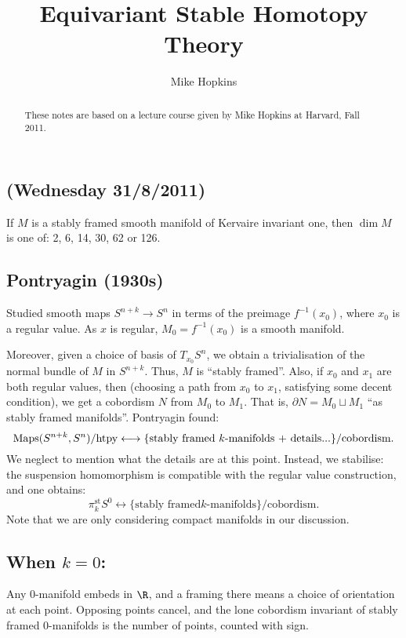 \documentclass[11pt]{article}
\title{Equivariant Stable Homotopy Theory}
\author{Mike Hopkins}
\date{}
\newcommand{\NewLecture}[3]{\section{#1 {\small(#2/#3/2011)}}}
\begin{document}
\maketitle
\begin{abstract}
These notes are based on a lecture course given by Mike Hopkins at Harvard, Fall 2011. %
\end{abstract}
\tableofcontents
\pagebreak
\begin{FirstWeek}
\setcounter{section}{0}
\NewLecture{}{Wednesday 31}{8}
\begin{thm*}
If $M$ is a stably framed smooth manifold of Kervaire invariant one, then $\dim
M$ is one of: 2, 6, 14, 30, 62 or 126.
\end{thm*}
\subsection*{Pontryagin (1930s)}
Studied smooth maps $S^{n+k}\to S^n$ in terms
of the preimage $f^{-1}(x_0)$, where $x_0$ is a regular value. As $x$ is
regular, $M_0=f^{-1}(x_0)$ is a smooth manifold.

Moreover, given a choice of basis of $T_{x_0}S^n$, we obtain a trivialisation of
the normal bundle of $M$ in $S^{n+k}$. Thus, $M$ is ``stably framed''. Also, if
$x_0$ and $x_1$ are both regular values, then (choosing a path from $x_0$ to
$x_1$, satisfying some decent condition), we get a cobordism $N$ from $M_0$ to
$M_1$. That is, $\partial N=M_0\sqcup M_1$ ``as stably framed manifolds''.
Pontryagin found:
\[\operatorname{Maps}(S^{n+k},S^n)/\text{htpy}\longleftrightarrow\{\text{stably framed
$k$-manifolds + details...}\}/\text{cobordism}.\]
We neglect to mention what the details are at this point. Instead, we stabilise:
the suspension homomorphism is compatible with the regular value construction,
and one obtains:
\[\pi_k^\text{st}S^0\longleftrightarrow\{\text{stably framed
$k$-manifolds}\}/\text{cobordism}.\]
Note that we are only considering compact manifolds in our discussion.
\subsection*{When \texorpdfstring{$k=0$}{k=0}:}
Any $0$-manifold embeds in $\R$, and a framing there means a choice of
orientation at each point. Opposing points cancel, and the lone cobordism
invariant of stably framed $0$-manifolds is the number of points, counted with
sign.


\end{FirstWeek}
\end{document}
